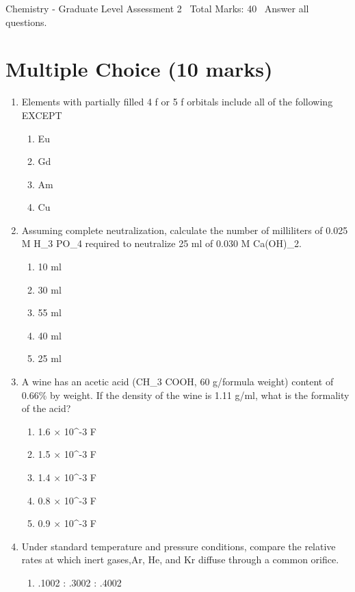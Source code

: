 \documentclass[12pt]{article}
\begin{document}
\begin{center}
Chemistry - Graduate Level Assessment 2 \
Total Marks: 40 \
Answer all questions.
\end{center}

\section*{Multiple Choice (10 marks)}
\begin{enumerate}[label=\arabic*.]
\item Elements with partially filled 4 f or 5 f orbitals include all of the following EXCEPT
\begin{enumerate}[label=(\alph*)]
    \item Eu
    \item Gd
    \item Am
    \item Cu
\end{enumerate}
\item Assuming complete neutralization, calculate the number of milliliters of 0.025 M H\_3 PO\_4 required to neutralize 25 ml of 0.030 M Ca(OH)\_2.
\begin{enumerate}[label=(\alph*)]
    \item 10 ml
    \item 30 ml
    \item 55 ml
    \item 40 ml
    \item 25 ml
\end{enumerate}
\item A wine has an acetic acid (CH\_3 COOH, 60 g/formula weight) content of 0.66\% by weight. If the density of the wine is 1.11 g/ml, what is the formality of the acid?
\begin{enumerate}[label=(\alph*)]
    \item 1.6 \ensuremath{\times} 10^-3 F
    \item 1.5 \ensuremath{\times} 10^-3 F
    \item 1.4 \ensuremath{\times} 10^-3 F
    \item 0.8 \ensuremath{\times} 10^-3 F
    \item 0.9 \ensuremath{\times} 10^-3 F
\end{enumerate}
\item Under standard temperature and pressure conditions, compare the relative rates at which inert gases,Ar, He, and Kr diffuse through a common orifice.
\begin{enumerate}[label=(\alph*)]
    \item .1002 : .3002 : .4002

\end{enumerate}
\end{enumerate}
\end{document}
